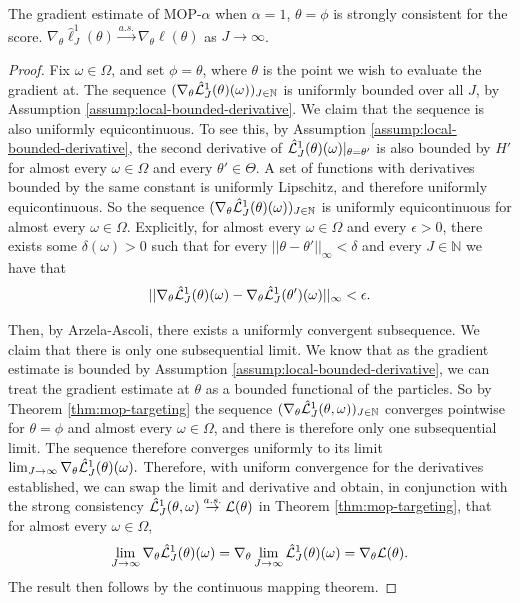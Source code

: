 \documentclass[9pt,twoside,lineno]{pnas-new-si}
\begin{document}
\begin{thm}
    The gradient estimate of MOP-$\alpha$ when $\alpha=1$, $\theta=\phi$ is strongly consistent for the score. $\nabla_\theta \hat\ell_J^1(\theta) \stackrel{a.s.}{\to} \nabla_\theta \ell(\theta)$ as $J \to \infty$.
    \label{thm:mop-grad-consistency}
\end{thm}
\begin{proof}
    Fix $\omega \in \Omega$, and set $\phi = \theta$, where $\theta$ is the point we wish to evaluate the gradient at. The sequence $(\nabla_\theta \hat{\mathcal{L}}_J^1(\theta)(\omega))_{J \in \mathbb{N}}$ is uniformly bounded over all $J$, by Assumption \ref{assump:local-bounded-derivative}. We claim that the sequence is also uniformly equicontinuous. To see this, by Assumption \ref{assump:local-bounded-derivative}, the second derivative of $\hat{\mathcal{L}}_J^1(\theta)(\omega)|_{\theta=\theta'}$ is also bounded by $H'$ for almost every $\omega\in \Omega$ and every $\theta'\in \Theta$. A set of functions with derivatives bounded by the same constant is uniformly Lipschitz, and therefore uniformly equicontinuous. So the sequence $(\nabla_\theta \hat{\mathcal{L}}_J^1(\theta)( \omega))_{J \in \mathbb{N}}$ is uniformly equicontinuous for almost every $\omega \in \Omega$. 
    Explicitly, for almost every $\omega \in \Omega$ and every $\epsilon>0$, there exists some $\delta(\omega)>0$ such that for every $||\theta - \theta'||_{\infty}<\delta$ and every $J \in \mathbb{N}$ we have that
    $$||\nabla_\theta \hat{\mathcal{L}}_J^1(\theta)(\omega)-\nabla_\theta \hat{\mathcal{L}}_J^1(\theta')(\omega)||_\infty < \epsilon.$$

    Then, by Arzela-Ascoli, there exists a uniformly convergent subsequence. We claim that there is only one subsequential limit. We know that as the gradient estimate is bounded by Assumption \ref{assump:local-bounded-derivative}, we can treat the gradient estimate at $\theta$ as a bounded functional of the particles. So by Theorem \ref{thm:mop-targeting} the sequence $(\nabla_\theta \hat{\mathcal{L}}_J^1(\theta, \omega))_{J \in \mathbb{N}}$ converges pointwise for $\theta=\phi$ and almost every $\omega \in \Omega$, and there is therefore only one subsequential limit. The sequence therefore converges uniformly to its limit $\lim_{J \to \infty} \nabla_\theta \hat{\mathcal{L}}_J^1(\theta)(\omega).$ Therefore, with uniform convergence for the derivatives established, we can swap the limit and derivative and obtain, in conjunction with the strong consistency $\hat{\mathcal{L}}_J^1(\theta, \omega) \stackrel{a.s.}{\to} \mathcal{L}(\theta)$ in Theorem \ref{thm:mop-targeting}, that for almost every $\omega \in \Omega$, 
    $$\lim_{J \to \infty} \nabla_\theta \hat{\mathcal{L}}_J^1(\theta)(\omega) = \nabla_\theta \lim_{J \to \infty} \hat{\mathcal{L}}_J^1(\theta)(\omega) = \nabla_\theta \mathcal{L}(\theta).$$
    The result then follows by the continuous mapping theorem. 
\end{proof}
\end{document}
